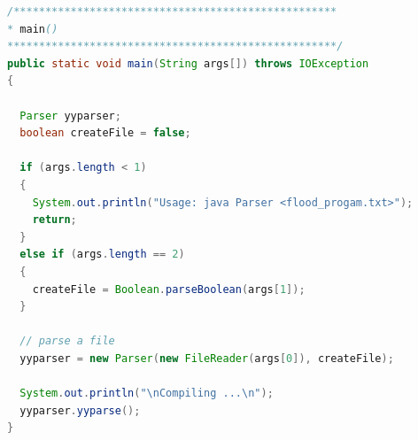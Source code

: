 \documentclass[12pt]{report}
\begin{document}
\begin{singlespace}
\begin{lstlisting}[language=Java,label=some-code,caption={flood$\_$grammar.y}]
/***************************************************
* main()
****************************************************/
public static void main(String args[]) throws IOException
{

  Parser yyparser;
  boolean createFile = false;

  if (args.length < 1)
  {
    System.out.println("Usage: java Parser <flood_progam.txt>");
    return;
  }
  else if (args.length == 2)
  {
    createFile = Boolean.parseBoolean(args[1]);
  }

  // parse a file
  yyparser = new Parser(new FileReader(args[0]), createFile);

  System.out.println("\nCompiling ...\n");
  yyparser.yyparse();
}
\end{lstlisting}
\end{singlespace}
\end{document}
